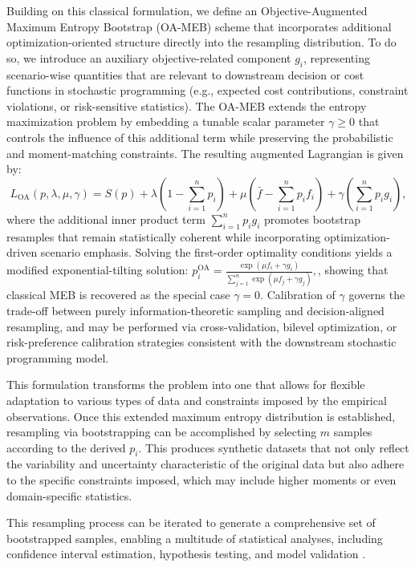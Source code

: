 \documentclass[ijoc,sglanonrev]{informs4}
\begin{document}
Building on this classical formulation, we define an Objective-Augmented Maximum Entropy Bootstrap (OA-MEB) scheme that incorporates additional optimization-oriented structure directly into the resampling distribution. To do so, we introduce an auxiliary objective-related component $g_i$, representing scenario-wise quantities that are relevant to downstream decision or cost functions in stochastic programming (e.g., expected cost contributions, constraint violations, or risk-sensitive statistics). The OA-MEB extends the entropy maximization problem by embedding a tunable scalar parameter $\gamma \ge 0$ that controls the influence of this additional term while preserving the probabilistic and moment-matching constraints. The resulting augmented Lagrangian is given by:
\begin{equation}
	L_{\mathrm{OA}}(p, \lambda, \mu, \gamma) = S(p) 
	+ \lambda \left( 1 - \sum_{i=1}^{n} p_i \right)
	+ \mu \left( \bar{f} - \sum_{i=1}^{n} p_i f_i \right)
	+ \gamma \left( \sum_{i=1}^{n} p_i g_i \right),
\end{equation}
where the additional inner product term $\sum_{i=1}^{n} p_i g_i$ promotes bootstrap resamples that remain statistically coherent while incorporating optimization-driven scenario emphasis. Solving the first-order optimality conditions yields a modified exponential-tilting solution: 
$
	p_i^{\mathrm{OA}} = \frac{\exp\left(\mu f_i + \gamma g_i\right)}
	{\sum_{j=1}^{n} \exp\left(\mu f_j + \gamma g_j\right)},
$, showing that classical MEB is recovered as the special case $\gamma = 0$. Calibration of $\gamma$ governs the trade-off between purely information-theoretic sampling and decision-aligned resampling, and may be performed via cross-validation, bilevel optimization, or risk-preference calibration strategies consistent with the downstream stochastic programming model.

This formulation transforms the problem into one that allows for flexible adaptation to various types of data and constraints imposed by the empirical observations. Once this extended maximum entropy distribution is established, resampling via bootstrapping can be accomplished by selecting  $m$ samples according to the derived $p_i$.  This produces synthetic datasets that not only reflect the variability and uncertainty characteristic of the original data but also adhere to the specific constraints imposed, which may include higher moments or even domain-specific statistics. 

This resampling process can be iterated to generate a comprehensive set of bootstrapped samples, enabling a multitude of statistical analyses, including confidence interval estimation, hypothesis testing, and model validation \citep{efron1993introduction}. 
\end{document}

